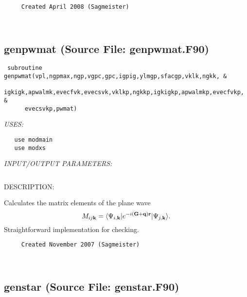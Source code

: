 \documentclass[11pt]{article}
\begin{document}
\begin{verbatim}     Created April 2008 (Sagmeister)\end{verbatim}


 
 
\mbox{}\hrulefill\ 
 
\subsection{genpwmat (Source File: genpwmat.F90)}


\begin{verbatim} subroutine genpwmat(vpl,ngpmax,ngp,vgpc,gpc,igpig,ylmgp,sfacgp,vklk,ngkk, &
      igkigk,apwalmk,evecfvk,evecsvk,vklkp,ngkkp,igkigkp,apwalmkp,evecfvkp, &
      evecsvkp,pwmat)\end{verbatim}{\em USES:}
\begin{verbatim}   use modmain
   use modxs\end{verbatim}{\em INPUT/OUTPUT PARAMETERS:}
\begin{verbatim} \end{verbatim}
{\sf DESCRIPTION:\\ }

    Calculates the matrix elements of the plane wave
     $$ M_{ij{\bf k}}=\langle\Psi_{i,{\bf k}}|e^{-i({\bf G}+{\bf q}){\bf r}}|
        \Psi_{j,{\bf k}}\rangle. $$
    Straightforward implementation for checking.
  
\begin{verbatim}     Created November 2007 (Sagmeister)\end{verbatim}






 
 
\mbox{}\hrulefill\ 
 
\subsection{genstar (Source File: genstar.F90)}
\end{document}
